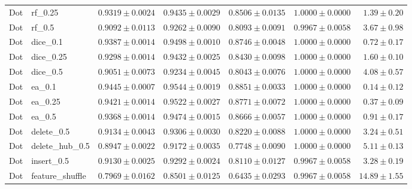 \documentclass[UTF8,a4paper,11pt,fontset=fandol]{ctexart}
\begin{document}
{\begin{longtable}{llrrrrr}
Dot & rf\_0.25 & $0.9319\pm0.0024$ & $0.9435\pm0.0029$ & $0.8506\pm0.0135$ & $1.0000\pm0.0000$ & $1.39\pm0.20$ \\
Dot & rf\_0.5 & $0.9092\pm0.0113$ & $0.9262\pm0.0090$ & $0.8093\pm0.0091$ & $0.9967\pm0.0058$ & $3.67\pm0.98$ \\
Dot & dice\_0.1 & $0.9387\pm0.0014$ & $0.9498\pm0.0010$ & $0.8746\pm0.0048$ & $1.0000\pm0.0000$ & $0.72\pm0.17$ \\
Dot & dice\_0.25 & $0.9298\pm0.0014$ & $0.9432\pm0.0025$ & $0.8430\pm0.0098$ & $1.0000\pm0.0000$ & $1.60\pm0.10$ \\
Dot & dice\_0.5 & $0.9051\pm0.0073$ & $0.9234\pm0.0045$ & $0.8043\pm0.0076$ & $1.0000\pm0.0000$ & $4.08\pm0.57$ \\
Dot & ea\_0.1 & $0.9445\pm0.0007$ & $0.9544\pm0.0019$ & $0.8851\pm0.0033$ & $1.0000\pm0.0000$ & $0.14\pm0.12$ \\
Dot & ea\_0.25 & $0.9421\pm0.0014$ & $0.9522\pm0.0027$ & $0.8771\pm0.0072$ & $1.0000\pm0.0000$ & $0.37\pm0.09$ \\
Dot & ea\_0.5 & $0.9368\pm0.0014$ & $0.9474\pm0.0015$ & $0.8666\pm0.0057$ & $1.0000\pm0.0000$ & $0.91\pm0.17$ \\
Dot & delete\_0.5 & $0.9134\pm0.0043$ & $0.9306\pm0.0030$ & $0.8220\pm0.0088$ & $1.0000\pm0.0000$ & $3.24\pm0.51$ \\
Dot & delete\_hub\_0.5 & $0.8947\pm0.0022$ & $0.9172\pm0.0035$ & $0.7748\pm0.0090$ & $1.0000\pm0.0000$ & $5.11\pm0.13$ \\
Dot & insert\_0.5 & $0.9130\pm0.0025$ & $0.9292\pm0.0024$ & $0.8110\pm0.0127$ & $0.9967\pm0.0058$ & $3.28\pm0.19$ \\
Dot & feature\_shuffle & $0.7969\pm0.0162$ & $0.8501\pm0.0125$ & $0.6435\pm0.0293$ & $0.9967\pm0.0058$ & $14.89\pm1.55$ \\
\end{longtable}
}
\end{document}

